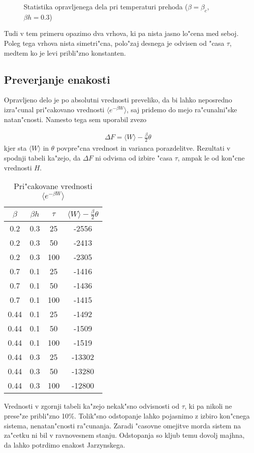 \documentclass[a4paper,10pt]{article}
\begin{document}
\begin{figure}[H]
\centering
 
 \caption{Statistika opravljenega dela pri temperaturi prehoda ($\beta = \beta_c$, $\beta h = 0.3$)}
\end{figure}

Tudi v tem primeru opazimo dva vrhova, ki pa nista jasno lo"cena med seboj. Poleg tega vrhova nista simetri"cna, polo"zaj desnega je odvisen od "casa $\tau$, medtem ko je levi pribli"zno konstanten. 

\subsection{Preverjanje enakosti}

Opravljeno delo je po absolutni vrednosti preveliko, da bi lahko neposredno izra"cunal pri"cakovano vrednosti $\langle e^{-\beta W}\rangle$, saj pridemo do mejo ra"cunalni"ske natan"cnosti. Namesto tega sem uporabil zvezo

\begin{align}
 \Delta F = \langle W \rangle - \frac{\beta}{2}\theta
\end{align}
kjer sta $\langle W \rangle$ in $\theta$ povpre"cna vrednost in varianca porazdelitve. Rezultati v spodnji tabeli ka"zejo, da $\Delta F$ ni odvisna od izbire "casa $\tau$, ampak le od kon"cne vrednosti $H$. 

\begin{table}[H]
\begin{center}
 \begin{tabular}{|c|c|c|c|}
 \hline
  $\beta$ & $\beta h$ & $\tau$ & $\langle W\rangle - \frac{\beta}{2}\theta$ \\
  \hline
  0.2 & 0.3 & 25 & -2556\\
  0.2 & 0.3 & 50 & -2413\\
  0.2 & 0.3 & 100 & -2305\\
  \hline
  0.7 & 0.1 & 25 & -1416\\
  0.7 & 0.1 & 50 & -1436\\
  0.7 & 0.1 & 100 & -1415\\
  \hline
  0.44 & 0.1 & 25 & -1492\\
  0.44 & 0.1 & 50 & -1509\\
  0.44 & 0.1 & 100 & -1519\\
  \hline
  0.44 & 0.3 & 25 & -13302\\
  0.44 & 0.3 & 50 & -13280\\
  0.44 & 0.3 & 100 & -12800\\
  \hline
 \end{tabular}
 \caption{Pri"cakovane vrednosti $\langle e^{-\beta W}\rangle$}
\end{center}
\end{table}

Vrednosti v zgornji tabeli ka"zejo nekak"sno odvisnosti od $\tau$, ki pa nikoli ne prese"ze pribli"zno 10\%. Tolik"sno odstopanje lahko pojasnimo z izbiro kon"cnega sistema, nenatan"cnosti ra"cunanja. Zaradi "casovne omejitve morda sistem na za"cetku ni bil v ravnovesnem stanju. Odstopanja so kljub temu dovolj majhna, da lahko potrdimo enakost Jarzynskega. 
\end{document}
